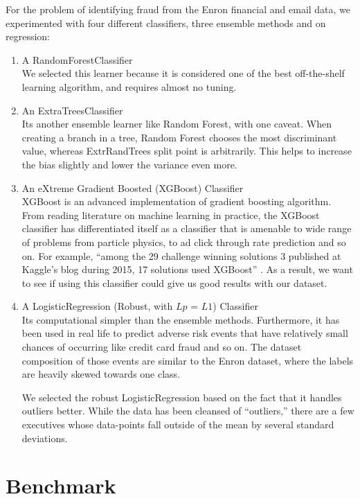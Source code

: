 \documentclass[twoside,openright,titlepage,numbers=noenddot,headinclude,%
               footinclude=true,cleardoublepage=empty,abstractoff,BCOR=5mm,%
               paper=a4,fontsize=11pt,ngerman,american]{scrreprt}
\numberwithin{theorem}{chapter}
\numberwithin{definition}{chapter}
\numberwithin{algorithm}{chapter}
\numberwithin{figure}{chapter}
\numberwithin{table}{chapter}
\numberwithin{equation}{chapter}
\begin{document}
For the problem of identifying fraud from the Enron financial and email data, we experimented with four different classifiers, three ensemble methods and on regression:
\begin{enumerate}%
\item A RandomForestClassifier\\
We selected this learner because it is considered one of the best off-the-shelf learning algorithm, and requires almost no tuning. 
\item An ExtraTreesClassifier\\
 Its another ensemble learner like Random Forest, with one caveat. When creating a branch in a tree, Random Forest chooses the most discriminant value, whereas ExtrRandTrees split point is arbitrarily. This helps to increase the bias slightly and lower the variance even more.
\item An eXtreme Gradient Boosted (XGBoost) Classifier\\
XGBoost is an advanced implementation of gradient boosting algorithm. From reading literature on machine learning in practice, the XGBoost classifier has differentiated itself as a classifier that is amenable to wide range of problems from particle physics, to ad click through rate prediction and so on. For example, ``among the 29 challenge winning solutions 3 published at Kaggle's
blog during 2015, 17 solutions used XGBoost'' \cite{ChenG16}. As a result, we want to see if using this classifier could give us good results with our dataset.

\item A LogisticRegression (Robust, with $Lp$ = $L1$) Classifier\\
Its computational simpler than the ensemble methods. Furthermore, it has been used in real life to predict adverse risk events that have relatively small chances of occurring like credit card fraud and so on. The dataset composition of those events are similar to the Enron dataset, where the labels are heavily skewed towards one class.

We selected the robust LogisticRegression based on the fact that it handles outliers better. While the data has been cleansed of ``outliers,'' there are a few executives whose data-points fall outside of the mean by several standard deviations.

\end{enumerate}



\section*{Benchmark}
\end{document}
